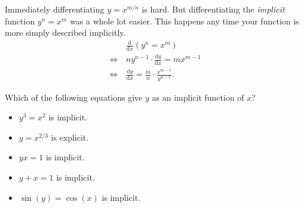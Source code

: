 Immediately differentiating \(y=x^{m/n}\) is hard. But differentiating the \textit{implicit} function \(y^n=x^m\) was a whole lot easier. This happens any time your function is more simply described implicitly.
\begin{align*}
    \phantom{\Leftrightarrow\,} & \frac{\mathrm{d}}{\mathrm{d}x}(y^n=x^m)\\
                             \Leftrightarrow\, & ny^{n-1}\cdot\frac{\mathrm{d}y}{\mathrm{d}x}=mx^{m-1}\\
                             \Leftrightarrow\, & \frac{\mathrm{d}y}{\mathrm{d}x}=\frac{m}{n}\cdot\frac{x^{m-1}}{y^{n-1}}.
\end{align*}

\begin{eg}
    Which of the following equations give \(y\) as an implicit function of \(x\)?
    \begin{itemize}
        \item \(y^3=x^2\) is implicit. 
        \item \(y=x^{2/3}\) is explicit.
        \item \(yx=1\) is implicit.
        \item \(y+x=1\) is implicit.
        \item \(\sin(y)=\cos(x)\) is implicit.
    \end{itemize}
\end{eg}


